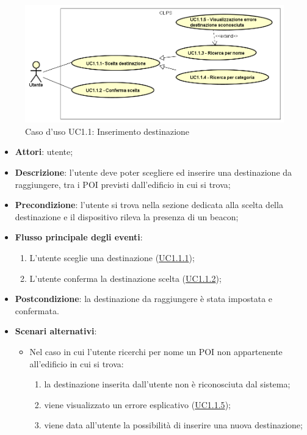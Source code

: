\documentclass[../AnalisiDeiRequisiti.tex]{subfiles}
\begin{document}
\begin{figure}[H]
	\centering
	\includegraphics[scale=0.95, width=\textwidth]{img/UC1-1.png}
	\caption{Caso d'uso UC1.1: Inserimento destinazione}\label{fig:UC1.1} 
\end{figure}
\begin{itemize}
	\item \textbf{Attori}: utente;
	\item \textbf{Descrizione}: l'utente deve poter scegliere ed inserire una destinazione da raggiungere, tra i POI previsti dall'edificio in cui si trova; 
	\item \textbf{Precondizione}: l'utente si trova nella sezione dedicata alla scelta della destinazione e il dispositivo rileva la presenza di un beacon;
	
	\item \textbf{Flusso principale degli eventi}:
	\begin{enumerate}
		\item L'utente sceglie una destinazione  (\hyperlink{UC1.1.1}{UC1.1.1});
		\item L'utente conferma la destinazione scelta  (\hyperlink{UC1.1.2}{UC1.1.2});
		
	\end{enumerate}
	\item \textbf{Postcondizione}: la destinazione da raggiungere è stata impostata e confermata.
	\item \textbf{Scenari alternativi}: 
	\begin{itemize}
		\item Nel caso in cui l'utente ricerchi per nome un POI non appartenente all'edificio in cui si trova: 
		\begin{enumerate}
			\item la destinazione inserita dall'utente non è riconosciuta dal sistema;
			\item viene visualizzato un errore esplicativo (\hyperlink{UC1.1.5}{UC1.1.5});
			\item viene data all’utente la possibilità di inserire una nuova destinazione;
		\end{enumerate}
	\end{itemize}
\end{itemize}
\hypertarget{UC1.1.1}{}
\end{document}
